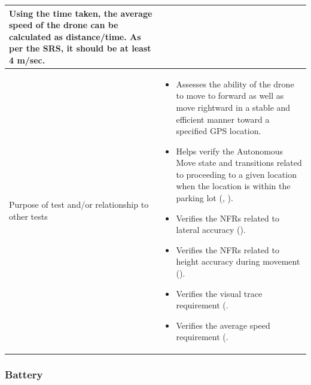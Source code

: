 \documentclass[12pt, titlepage]{article}
\begin{document}
\begin{table}[!h]
\begin{center}
\begin{tabular}{ | m{3.2cm} | m{12.2cm} | }
Using the time taken, the average speed of the drone can be calculated as distance/time. As per the SRS, it should be at least 4 m/sec. 
 \\ 
\hline
Purpose of test and/or relationship to other tests & 
\begin{itemize}
    \item Assesses the ability of the drone to move to forward as well as move rightward in a stable and efficient manner toward a specified GPS location.
    \item Helps verify the Autonomous Move state and transitions related to proceeding to a given location when the location is within the parking lot (\nameref{STA_002}, \nameref{TRANS_005}).
    \item Verifies the NFRs related to lateral accuracy (\nameref{PERF_008}). 
    \item Verifies the NFRs related to height accuracy during movement (\nameref{PERF_006}). 
    \item Verifies the visual trace requirement (\nameref{USE_001}. 
    \item Verifies the average speed requirement (\nameref{PERF_003}. 
\end{itemize}
\\ 
\hline
\end{tabular}
\end{center}
\end{table}

\clearpage

\subsubsection{Battery}
\end{document}
